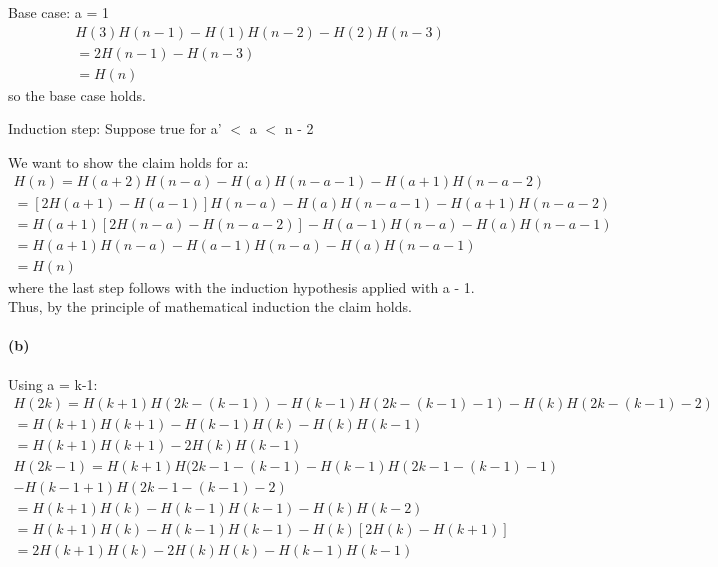 \documentclass[11pt,a4paper]{article}
\begin{document}
Base case: a = 1
\begin{equation}
	\begin{aligned}
H(3)H(n-1) - H(1)H(n-2) - H(2)H(n-3) \\
= 2H(n-1) - H(n-3) \\
= H(n)
	\end{aligned}
\end{equation}
so the base case holds.

Induction step: Suppose true for a' $<$ a $<$ n - 2

We want to show the claim holds for a:
\begin{equation}
	\begin{aligned} 
	H(n) = H(a+2)H(n-a) - H(a)H(n-a-1) - H(a+1)H(n-a-2) \\ = [2H(a+1) - H(a-1)]H(n-a) - H(a)H(n-a-1) - H(a+1)H(n-a-2)
	\\ = H(a+1)[2H(n-a) - H(n-a-2)] - H(a-1)H(n-a) - H(a)H(n-a-1)
	\\ = H(a+1)H(n-a) - H(a-1)H(n-a) - H(a)H(n-a-1)
	\\ = H(n)
	\end{aligned}
\end{equation}
where the last step follows with the induction hypothesis applied with a - 1.
Thus, by the principle of mathematical induction the claim holds. 

\paragraph*{(b)}
Using a = k-1:
\begin{equation}
	\begin{aligned}
	H(2k) = H(k+1)H(2k-(k-1)) - H(k-1)H(2k-(k-1)-1) - H(k)H(2k-(k-1)-2) 
 \\= H(k+1)H(k+1) - H(k-1)H(k) - H(k)H(k-1) 
 \\= H(k+1)H(k+1) - 2H(k)H(k-1)
 	\end{aligned}
\end{equation}
\begin{equation}
	\begin{aligned}
	H(2k-1) = H(k+1)H(2k-1-(k-1) - H(k-1)H(2k-1-(k-1)-1) \\
	- H(k-1+1)H(2k-1-(k-1)-2)
	\\= H(k+1)H(k) - H(k-1)H(k-1) - H(k)H(k-2)
	\\= H(k+1)H(k) - H(k-1)H(k-1) - H(k)[2H(k) - H(k+1)]
	\\=2H(k+1)H(k) - 2H(k)H(k) - H(k-1)H(k-1)
 	\end{aligned}
\end{equation}
\end{document}
